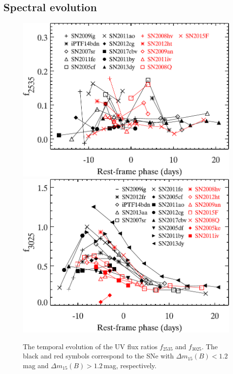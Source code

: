 \documentclass[useAMS,usenatbib]{mn2e}
\newcommand{\deltam}{\ensuremath{\Delta m_{15}}}
\begin{document}
\subsection{Spectral evolution}
\label{sec:evolution}
\begin{figure}
	\centering
		\includegraphics[scale=0.5]{plot/uv_evolution_2535.pdf}\\
		\includegraphics[scale=0.5]{plot/uv_evolution_3025.pdf}\\
                \caption{The temporal evolution of the UV flux ratios $f_{2535}$ and $f_{3025}$. The black and red symbols correspond to the SNe with $\deltam(B)<1.2$\,mag and $\deltam(B)>1.2$\,mag, respectively.}
        \label{uv-evolution2}
\end{figure}
\end{document}

